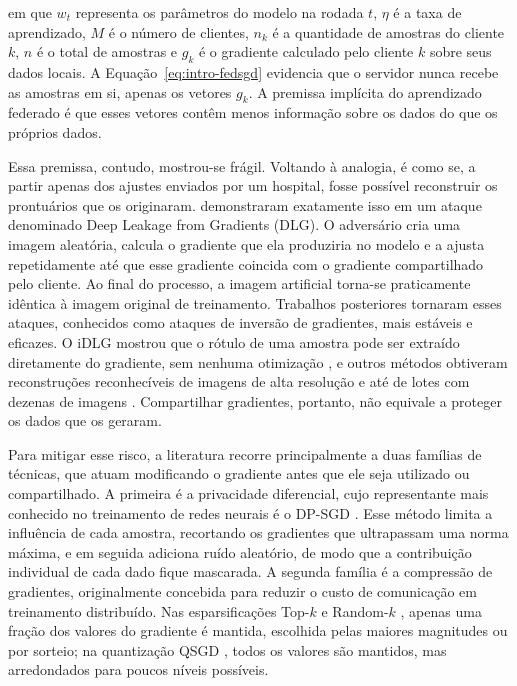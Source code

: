\noindent em que $w_t$ representa os parâmetros do modelo na rodada $t$, $\eta$ é a taxa de aprendizado, $M$ é o número de clientes, $n_k$ é a quantidade de amostras do cliente $k$, $n$ é o total de amostras e $g_k$ é o gradiente calculado pelo cliente $k$ sobre seus dados locais. A Equação~\ref{eq:intro-fedsgd} evidencia que o servidor nunca recebe as amostras em si, apenas os vetores $g_k$. A premissa implícita do aprendizado federado é que esses vetores contêm menos informação sobre os dados do que os próprios dados.

Essa premissa, contudo, mostrou-se frágil. Voltando à analogia, é como se, a partir apenas dos ajustes enviados por um hospital, fosse possível reconstruir os prontuários que os originaram.  demonstraram exatamente isso em um ataque denominado Deep Leakage from Gradients (DLG). O adversário cria uma imagem aleatória, calcula o gradiente que ela produziria no modelo e a ajusta repetidamente até que esse gradiente coincida com o gradiente compartilhado pelo cliente. Ao final do processo, a imagem artificial torna-se praticamente idêntica à imagem original de treinamento. Trabalhos posteriores tornaram esses ataques, conhecidos como ataques de inversão de gradientes, mais estáveis e eficazes. O iDLG mostrou que o rótulo de uma amostra pode ser extraído diretamente do gradiente, sem nenhuma otimização \cite{Zhao2020}, e outros métodos obtiveram reconstruções reconhecíveis de imagens de alta resolução e até de lotes com dezenas de imagens \cite{Geiping2020,Yin2021}. Compartilhar gradientes, portanto, não equivale a proteger os dados que os geraram.

Para mitigar esse risco, a literatura recorre principalmente a duas famílias de técnicas, que atuam modificando o gradiente antes que ele seja utilizado ou compartilhado. A primeira é a privacidade diferencial, cujo representante mais conhecido no treinamento de redes neurais é o DP-SGD \cite{Abadi2016}. Esse método limita a influência de cada amostra, recortando os gradientes que ultrapassam uma norma máxima, e em seguida adiciona ruído aleatório, de modo que a contribuição individual de cada dado fique mascarada. A segunda família é a compressão de gradientes, originalmente concebida para reduzir o custo de comunicação em treinamento distribuído. Nas esparsificações Top-$k$ \cite{Stich2018} e Random-$k$ \cite{Wangni2018}, apenas uma fração dos valores do gradiente é mantida, escolhida pelas maiores magnitudes ou por sorteio; na quantização QSGD \cite{Alistarh2017}, todos os valores são mantidos, mas arredondados para poucos níveis possíveis.

